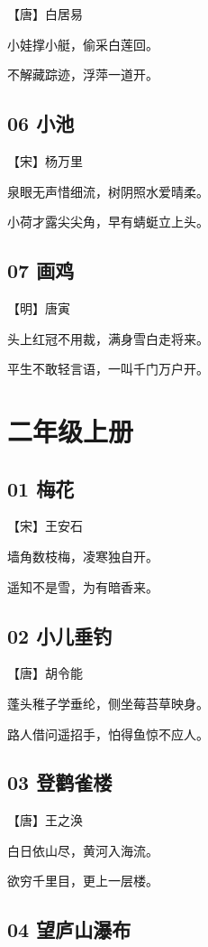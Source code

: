 \documentclass[a6paper, 12pt]{article}
\begin{document}
【唐】白居易


小娃撑小艇，偷采白莲回。

不解藏踪迹，浮萍一道开。

\subsection*{06 小池}

【宋】杨万里

泉眼无声惜细流，树阴照水爱晴柔。

小荷才露尖尖角，早有蜻蜓立上头。

\subsection*{07 画鸡}

【明】唐寅

头上红冠不用裁，满身雪白走将来。

平生不敢轻言语，一叫千门万户开。

\newpage

\section*{二年级上册}

\subsection*{01 梅花}

【宋】王安石

墙角数枝梅，凌寒独自开。

遥知不是雪，为有暗香来。

\subsection*{02 小儿垂钓}

【唐】胡令能

蓬头稚子学垂纶，侧坐莓苔草映身。

路人借问遥招手，怕得鱼惊不应人。

\subsection*{03 登鹳雀楼}

【唐】王之涣

白日依山尽，黄河入海流。

欲穷千里目，更上一层楼。

\subsection*{04 望庐山瀑布}
\end{document}
